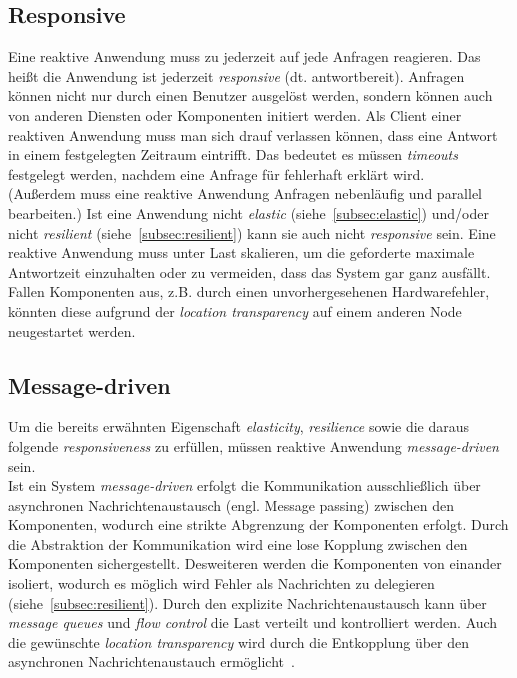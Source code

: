 \subsection{Responsive}\label{subsec:responsive}
Eine reaktive Anwendung muss zu jederzeit auf jede Anfragen reagieren. Das heißt die Anwendung ist jederzeit \textit{responsive} (dt. antwortbereit). Anfragen können nicht nur durch einen Benutzer ausgelöst werden, sondern können auch von anderen Diensten oder Komponenten initiert werden. Als Client einer reaktiven Anwendung muss man sich drauf verlassen können, dass eine Antwort in einem festgelegten Zeitraum eintrifft. Das bedeutet es müssen \textit{timeouts} festgelegt werden, nachdem eine Anfrage für fehlerhaft erklärt wird.\\
(Außerdem muss eine reaktive Anwendung Anfragen nebenläufig und parallel bearbeiten.)
Ist eine Anwendung nicht \textit{elastic} (siehe~\ref{subsec:elastic}) und/oder nicht \textit{resilient} (siehe~\ref{subsec:resilient}) kann sie auch nicht \textit{responsive} sein. Eine reaktive Anwendung muss unter Last skalieren, um die geforderte maximale Antwortzeit einzuhalten oder zu vermeiden, dass das System gar ganz ausfällt. Fallen Komponenten aus, z.B. durch einen unvorhergesehenen Hardwarefehler, könnten diese aufgrund der \textit{location transparency} auf einem anderen Node neugestartet werden.

\pagebreak

\subsection{Message-driven}\label{subsec:messagedriven}
Um die bereits erwähnten Eigenschaft \textit{elasticity}, \textit{resilience} sowie die daraus folgende \textit{responsiveness} zu erfüllen, müssen reaktive Anwendung \textit{message-driven} sein.\\
Ist ein System \textit{message-driven} erfolgt die Kommunikation ausschließlich über asynchronen Nachrichtenaustausch (engl. Message passing) zwischen den Komponenten, wodurch eine strikte Abgrenzung der Komponenten erfolgt. Durch die Abstraktion der Kommunikation wird eine lose Kopplung zwischen den Komponenten sichergestellt. Desweiteren werden die Komponenten von einander isoliert, wodurch es möglich wird Fehler als Nachrichten zu delegieren (siehe~\ref{subsec:resilient}).
Durch den explizite Nachrichtenaustausch kann über \textit{message queues} und \textit{flow control} die Last verteilt und kontrolliert werden. Auch die gewünschte \textit{location transparency} wird durch die Entkopplung über den asynchronen Nachrichtenaustauch ermöglicht~\cite{boner_reactive_2015}.



